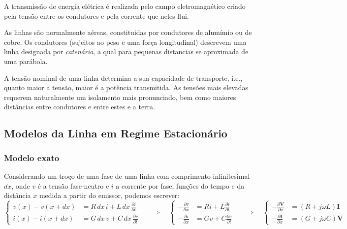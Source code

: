 
A transmissão de energia elétrica é realizada pelo campo eletromagnético criado pela tensão entre os condutores e pela corrente que neles flui.

As linhas são normalmente aéreas, constituidas por condutores de alumímio ou de cobre. Os condutores (sujeitos ao peso e uma força longitudinal) descrevem uma linha designada por \textit{catenária}, a qual para pequenas distancias se aproximada de uma parábola.

A tensão nominal de uma linha determina a sua capacidade de transporte, i.e., quanto maior a tensão, maior é a potência transmitida. As tensões mais elevadas requerem naturalmente um isolamento mais pronunciado, bem como maiores distâncias entre condutores e entre estes e a terra. 

\subsection{Modelos da Linha em Regime Estacionário}

\subsubsection{Modelo exato}

Considerando um troço de uma fase de uma linha com comprimento infinitesimal $dx$, onde $v$ é a tensão fase-neutro e $i$ a corrente por fase, funções do tempo e da distância $x$ medida a partir do emissor, podemos escrever:
$$
    \left\{
    \begin{aligned}
        v(x) - v(x+dx) &= R\, dx\, i + L\, dx\, \frac{\partial i}{\partial t} \\[8pt]
        i(x) - i(x+dx) &= G\, dx\, v + C\, dx\, \frac{\partial v}{\partial t}
    \end{aligned}\right.
    \quad\implies\quad
    \left\{
    \begin{aligned}
        -\frac{\partial v}{\partial x} &= Ri + L\frac{\partial i}{\partial t} \\[8pt]
        -\frac{\partial i}{\partial x} &= Gv + C\frac{\partial v}{\partial t}
    \end{aligned}\right.
    \quad\implies\quad
    \left\{
    \begin{aligned}
        -\frac{\partial \mathbf{V}}{\partial x} &= (R + j\omega L) \mathbf{I} \\[8pt]
        -\frac{\partial \mathbf{I}}{\partial x} &= (G + j\omega C) \mathbf{V}
    \end{aligned}\right.
$$

